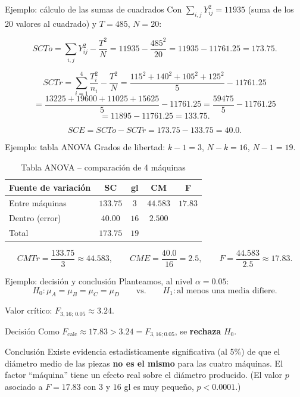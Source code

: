\documentclass[aspectratio=169,11pt]{beamer}
\begin{document}
\begin{frame}{Ejemplo: cálculo de las sumas de cuadrados}
Con $\sum_{i,j} Y_{ij}^2 = 11935$ (suma de los 20 valores al cuadrado) y $T=485$, $N=20$:

\[
SCTo = \sum_{i,j} Y_{ij}^2 - \frac{T^2}{N} = 11935 - \frac{485^2}{20} = 11935 - 11761.25 = 173.75.
\]

\[
SCTr = \sum_{i=1}^4 \frac{T_i^2}{n_i} - \frac{T^2}{N} = \frac{115^2+140^2+105^2+125^2}{5} - 11761.25
\]
\[
= \frac{13225+19600+11025+15625}{5} - 11761.25 = \frac{59475}{5}-11761.25
\]
\[
= 11895-11761.25 = 133.75.
\]

\[
SCE = SCTo - SCTr = 173.75 - 133.75 = 40.0.
\]
\end{frame}

\begin{frame}{Ejemplo: tabla ANOVA}
Grados de libertad: $k-1=3$, $N-k=16$, $N-1=19$.

\begin{table}[htbp]
\centering
\begin{tabular}{lcccc}
\toprule
Fuente de variación & SC & gl & CM & F \\
\midrule
Entre máquinas & $133.75$ & $3$ & $44.583$ & $17.83$ \\
Dentro (error) & $40.00$ & $16$ & $2.500$ & \\
\midrule
Total & $173.75$ & $19$ & & \\
\bottomrule
\end{tabular}
\caption{Tabla ANOVA -- comparación de 4 máquinas}
\end{table}

\[
CMTr = \frac{133.75}{3} \approx 44.583, \qquad CME = \frac{40.0}{16} = 2.5, \qquad F = \frac{44.583}{2.5}\approx 17.83.
\]
\end{frame}

\begin{frame}{Ejemplo: decisión y conclusión}
Planteamos, al nivel $\alpha=0.05$:
\[
H_0: \mu_A=\mu_B=\mu_C=\mu_D \qquad \text{vs.} \qquad H_1: \text{al menos una media difiere.}
\]

Valor crítico: $F_{3,16;\,0.05} \approx 3.24$.

\begin{alertblock}{Decisión}
Como $F_{\text{calc}} \approx 17.83 > 3.24 = F_{3,16;0.05}$, se \textbf{rechaza} $H_0$.
\end{alertblock}

\begin{block}{Conclusión}
Existe evidencia estadísticamente significativa (al 5\%) de que el diámetro medio de las piezas \textbf{no es el mismo} para las cuatro máquinas. El factor ``máquina'' tiene un efecto real sobre el diámetro producido. (El valor $p$ asociado a $F=17.83$ con $3$ y $16$ gl es muy pequeño, $p<0.0001$.)
\end{block}
\end{frame}
\end{document}
